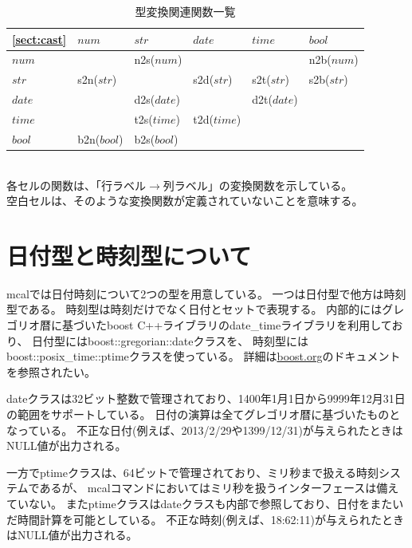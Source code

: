 \begin{table}[!hb]
\begin{center}
\caption{型変換関連関数一覧\label{tbl:mcal_cast}}
{\small
\begin{tabular}{l|l|l|l|l|l} \hline
\ref{sect:cast} & $num$       & $str$       & $date$     & $time$     & $bool$     \\
\hline
\hline
$num$  &             & n2s($num$)  &            &            & n2b($num$) \\
\hline
$str$  & s2n($str$)  &             & s2d($str$) & s2t($str$) & s2b($str$) \\
\hline
$date$ &             & d2s($date$) &            & d2t($date$)& \\
\hline
$time$ &             & t2s($time$) & t2d($time$)&            & \\
\hline
$bool$ & b2n($bool$) & b2s($bool$) &            &            & \\
\hline
  \end{tabular}
\\各セルの関数は、「行ラベル$\rightarrow$列ラベル」の変換関数を示している。
\\空白セルは、そのような変換関数が定義されていないことを意味する。
  }
  \end{center}
\end{table}

\section{日付型と時刻型について\label{sect:datetime}}
mcalでは日付時刻について2つの型を用意している。
一つは日付型で他方は時刻型である。
時刻型は時刻だけでなく日付とセットで表現する。
内部的にはグレゴリオ暦に基づいたboost C++ライブラリのdate\_timeライブラリを利用しており、
日付型にはboost::gregorian::dateクラスを、
時刻型にはboost::posix\_time::ptimeクラスを使っている。
詳細は\href{http://www.boost.org/}{boost.org}のドキュメントを参照されたい。

dateクラスは32ビット整数で管理されており、1400年1月1日から9999年12月31日の範囲をサポートしている。
日付の演算は全てグレゴリオ暦に基づいたものとなっている。
不正な日付(例えば、2013/2/29や1399/12/31)が与えられたときはNULL値が出力される。

一方でptimeクラスは、64ビットで管理されており、ミリ秒まで扱える時刻システムであるが、
mcalコマンドにおいてはミリ秒を扱うインターフェースは備えていない。
またptimeクラスはdateクラスも内部で参照しており、日付をまたいだ時間計算を可能としている。
不正な時刻(例えば、18:62:11)が与えられたときはNULL値が出力される。

